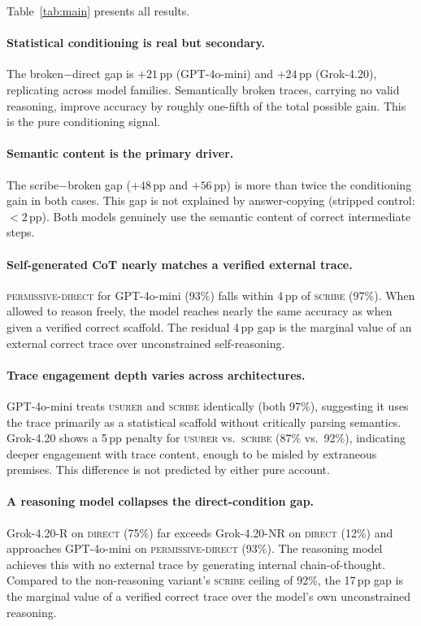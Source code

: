 \documentclass[11pt]{article}
\begin{document}
Table~\ref{tab:main} presents all results.

\paragraph{Statistical conditioning is real but secondary.}
The broken$-$direct gap is $+21$\,pp (GPT-4o-mini) and $+24$\,pp (Grok-4.20), replicating
across model families. Semantically broken traces, carrying no valid reasoning, improve
accuracy by roughly one-fifth of the total possible gain. This is the pure conditioning signal.

\paragraph{Semantic content is the primary driver.}
The scribe$-$broken gap ($+48$\,pp and $+56$\,pp) is more than twice the conditioning gain
in both cases. This gap is not explained by answer-copying (stripped control: $< 2$\,pp).
Both models genuinely use the semantic content of correct intermediate steps.

\paragraph{Self-generated CoT nearly matches a verified external trace.}
\textsc{permissive-direct} for GPT-4o-mini (93\%) falls within 4\,pp of \textsc{scribe}
(97\%). When allowed to reason freely, the model reaches nearly the same accuracy as when
given a verified correct scaffold. The residual 4\,pp gap is the marginal value of an
external correct trace over unconstrained self-reasoning.

\paragraph{Trace engagement depth varies across architectures.}
GPT-4o-mini treats \textsc{usurer} and \textsc{scribe} identically (both 97\%), suggesting
it uses the trace primarily as a statistical scaffold without critically parsing semantics.
Grok-4.20 shows a 5\,pp penalty for \textsc{usurer} vs.\ \textsc{scribe} (87\% vs.\ 92\%),
indicating deeper engagement with trace content, enough to be misled by extraneous premises.
This difference is not predicted by either pure account.

\paragraph{A reasoning model collapses the direct-condition gap.}
Grok-4.20-R on \textsc{direct} (75\%) far exceeds Grok-4.20-NR on \textsc{direct} (12\%)
and approaches GPT-4o-mini on \textsc{permissive-direct} (93\%). The reasoning model achieves
this with no external trace by generating internal chain-of-thought. Compared to the
non-reasoning variant's \textsc{scribe} ceiling of 92\%, the 17\,pp gap is the marginal
value of a verified correct trace over the model's own unconstrained reasoning.
\end{document}
